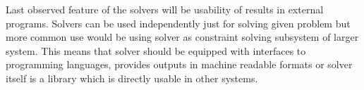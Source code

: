 Last observed feature of the solvers will be usability of results in external programs. Solvers can be used independently just for solving given problem but more common use would be using solver as constraint solving subsystem of larger system. This means that solver should be equipped with interfaces to programming languages, provides outputs in machine readable formats or solver itself is a library which is directly usable in other systems.

